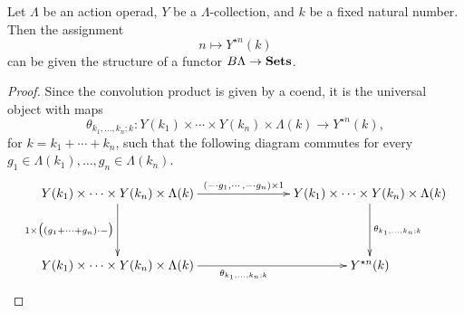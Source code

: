 \begin{lem}\label{lem:calclem2}
Let $\Lambda$ be an action operad, $Y$ be a $\Lambda$-collection, and $k$ be a fixed natural number. Then the assignment
  \[
    n \mapsto Y^{\star n}(k)
  \]
can be given the structure of a functor $B\Lambda \rightarrow \mathbf{Sets}$.
\end{lem}
\begin{proof}
Since the convolution product is given by a coend, it is the universal object with maps
  \[
    \theta_{k_1, \ldots, k_n; k} \colon Y(k_{1}) \times \cdots \times Y(k_{n}) \times \Lambda(k) \rightarrow Y^{\star n}(k),
  \]
for $k= k_1 + \cdots + k_n$, such that the following diagram commutes for every $g_{1} \in \Lambda(k_{1}), \ldots, g_{n} \in \Lambda(k_{n})$.
  \[
    \xy
      (0,0)*+{Y(k_1) \times \cdots \times Y(k_n)  \times \Lambda(k)}="a";
      (70,0)*+{Y(k_1) \times \cdots \times Y(k_n) \times \Lambda(k)}="b";
      (70,-20)*+{Y^{\star n}(k)}="c";
      (0,-20)*+{Y(k_1) \times \cdots \times Y(k_n)  \times \Lambda(k)}="d";
      {\ar^{(-\cdot g_1, \cdots, -\cdot g_n) \times 1} "a" ; "b"};
      {\ar_{1 \times \big( (g_1 + \cdots + g_n)\cdot -\big)} "a" ; "d"};
      {\ar^{\theta_{k_1, \ldots, k_n; k}} "b" ; "c"};
      {\ar_{\theta_{k_1, \ldots, k_n; k}} "d" ; "c"};
    \endxy
  \]
%


\end{proof}
